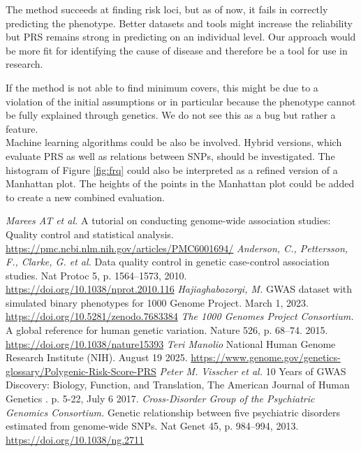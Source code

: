 \documentclass[letterpaper, 11pt]{article}
\begin{document}
The method succeeds at finding risk loci, but as of now, it fails in correctly predicting the phenotype. Better datasets and tools might increase the reliability but PRS remains strong in predicting on an individual level. Our approach would be more fit for identifying the cause of disease and therefore be a tool for use in research. 

If the method is not able to find minimum covers, this might be due to a violation of the initial assumptions or in particular because the phenotype cannot be fully explained through genetics. We do not see this as a bug but rather a feature.\\

Machine learning algorithms could be also be involved. Hybrid versions, which evaluate PRS as well as relations between SNPs, should be investigated. The histogram of Figure \ref{fig:frq} could also be interpreted as a refined version of a Manhattan plot. The heights of the points in the Manhattan plot could be added to create a new combined evaluation. 


\newpage
\begin{thebibliography}{99}
\emph{Marees AT et al. } A tutorial on conducting genome-wide association studies: Quality control and statistical analysis. \url{https://pmc.ncbi.nlm.nih.gov/articles/PMC6001694/}
\emph{Anderson, C., Pettersson, F., Clarke, G. et al. } Data quality control in genetic case-control association studies. Nat Protoc 5, p. 1564–1573, 2010. \url{https://doi.org/10.1038/nprot.2010.116}
\emph{Hajiaghabozorgi, M. } GWAS dataset with simulated binary phenotypes for 1000 Genome Project. March 1, 2023. \url{https://doi.org/10.5281/zenodo.7683384}
\emph{The 1000 Genomes Project Consortium.} A global reference for human genetic variation. Nature 526, p. 68–74. 2015.\url{ https://doi.org/10.1038/nature15393}
\emph{Teri Manolio} National Human Genome Research Institute (NIH). August 19 2025. \url{https://www.genome.gov/genetics-glossary/Polygenic-Risk-Score-PRS}
\emph{Peter M. Visscher et al. } 10 Years of GWAS Discovery: Biology, Function, and Translation, The American Journal of Human Genetics . p. 5-22,  July 6 2017.
\emph{Cross-Disorder Group of the Psychiatric Genomics Consortium.} Genetic relationship between five psychiatric disorders estimated from genome-wide SNPs. Nat Genet 45, p. 984–994, 2013. \url{https://doi.org/10.1038/ng.2711}
\end{thebibliography}
\end{document}
